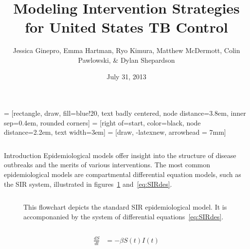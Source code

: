 \documentclass[final]{beamer}
\title{\huge Modeling Intervention Strategies for United States TB Control}
\author{Jessica Ginepro, Emma Hartman, Ryo Kimura, Matthew McDermott, Colin
        Pawlowski, \& Dylan Shepardson}
\institute[MHC]{Mathematical Modeling Group, Mount Holyoke College, South
                Hadley, MA, USA}
\date[July 31, 2013]{July 31, 2013}
\begin{document}
 = [rectangle, draw, fill=blue!20, text badly centered,
  node distance=3.8em, inner sep=0.4em, rounded corners]
 = [right of=start, color=black, node distance=2.2em,
text width=3em]
 = [draw, -latexnew, arrowhead = 7mm]


\begin{frame}
  \begin{columns}
    \begin{column}{.3\textwidth}
      \vspace{-3.6em}
      \begin{block}{Introduction}
        Epidemiological models offer insight into the structure of disease
        outbreaks and the merits of various interventions. The most common
        epidemiological models are compartmental differential equation models,
        such as the SIR system, illustrated in figures~\ref{fig:SIRFlowchart}
        and~\ref{eq:SIRdes}. 
        \begin{block}{}
          \begin{column}{.39\textwidth}
            \begin{figure}[h]
              \begin{center}
              \end{center}
              \caption{This flowchart depicts the standard SIR epidemiological
                       model. It is accomponanied by the system of differential
                       equations~\ref{eq:SIRdes}.}
              \label{fig:SIRFlowchart}
            \end{figure}
          \end{column}
          \begin{column}{.39\textwidth}
            \begin{figure}[h]
              \begin{align*}
                \frac{dS}{dt} &= -\beta S(t)I(t) \\

\end{align*}
\end{figure}
\end{column}
\end{block}
\end{block}
\end{column}
\end{columns}
\end{frame}
\end{document}
